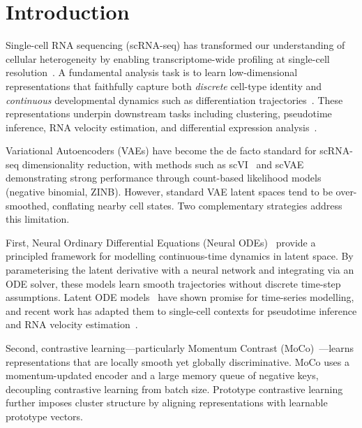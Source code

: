 \documentclass[preprint,12pt,number]{elsarticle}
\begin{document}
\section{Introduction}
\label{sec:introduction}

Single-cell RNA sequencing (scRNA-seq) has transformed our understanding of cellular heterogeneity by enabling transcriptome-wide profiling at single-cell resolution~\cite{tang2009mrna}. A fundamental analysis task is to learn low-dimensional representations that faithfully capture both \textit{discrete} cell-type identity and \textit{continuous} developmental dynamics such as differentiation trajectories~\cite{kiselev2019challenges,trapnell2014dynamics}. These representations underpin downstream tasks including clustering, pseudotime inference, RNA velocity estimation, and differential expression analysis~\cite{wolf2018scanpy}.

Variational Autoencoders (VAEs) have become the de facto standard for scRNA-seq dimensionality reduction, with methods such as scVI~\cite{lopez2018deep} and scVAE~\cite{gronbech2020scvae} demonstrating strong performance through count-based likelihood models (negative binomial, ZINB). However, standard VAE latent spaces tend to be over-smoothed, conflating nearby cell states. Two complementary strategies address this limitation.

First, Neural Ordinary Differential Equations (Neural ODEs)~\cite{chen2018neural} provide a principled framework for modelling continuous-time dynamics in latent space. By parameterising the latent derivative with a neural network and integrating via an ODE solver, these models learn smooth trajectories without discrete time-step assumptions. Latent ODE models~\cite{rubanova2019latent} have shown promise for time-series modelling, and recent work has adapted them to single-cell contexts for pseudotime inference and RNA velocity estimation~\cite{fu2025panode}.

Second, contrastive learning---particularly Momentum Contrast (MoCo)~\cite{he2020momentum}---learns representations that are locally smooth yet globally discriminative. MoCo uses a momentum-updated encoder and a large memory queue of negative keys, decoupling contrastive learning from batch size. Prototype contrastive learning~\cite{li2021prototypical} further imposes cluster structure by aligning representations with learnable prototype vectors.
\end{document}

